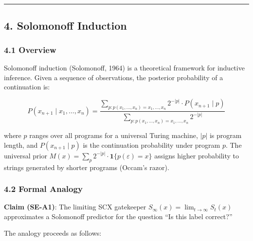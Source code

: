 \documentclass[
  12pt,
]{ctexart}
\begin{document}
\begin{center}\rule{0.5\linewidth}{0.5pt}\end{center}

\subsection{4. Solomonoff Induction}\label{solomonoff-induction}

\subsubsection{4.1 Overview}\label{overview-3}

Solomonoff induction (Solomonoff, 1964) is a theoretical framework for
inductive inference. Given a sequence of observations, the posterior
probability of a continuation is:

\[P(x_{n+1} \mid x_1, \ldots, x_n) = \frac{\sum_{p: p(x_1,\ldots,x_n) = x_1,\ldots,x_n} 2^{-|p|} \cdot P(x_{n+1} \mid p)}{\sum_{p: p(x_1,\ldots,x_n) = x_1,\ldots,x_n} 2^{-|p|}}\]

where \(p\) ranges over all programs for a universal Turing machine,
\(|p|\) is program length, and \(P(x_{n+1} \mid p)\) is the continuation
probability under program \(p\). The universal prior
\(M(x) = \sum_p 2^{-|p|} \cdot \mathbf{1}\{p(\varepsilon) = x\}\)
assigns higher probability to strings generated by shorter programs
(Occam's razor).

\subsubsection{4.2 Formal Analogy}\label{formal-analogy}

\textbf{Claim (SE-A1)}: The limiting SCX gatekeeper
\(S_\infty(x) = \lim_{t\to\infty} S_t(x)\) approximates a Solomonoff
predictor for the question ``Is this label correct?''

The analogy proceeds as follows:
\end{document}
